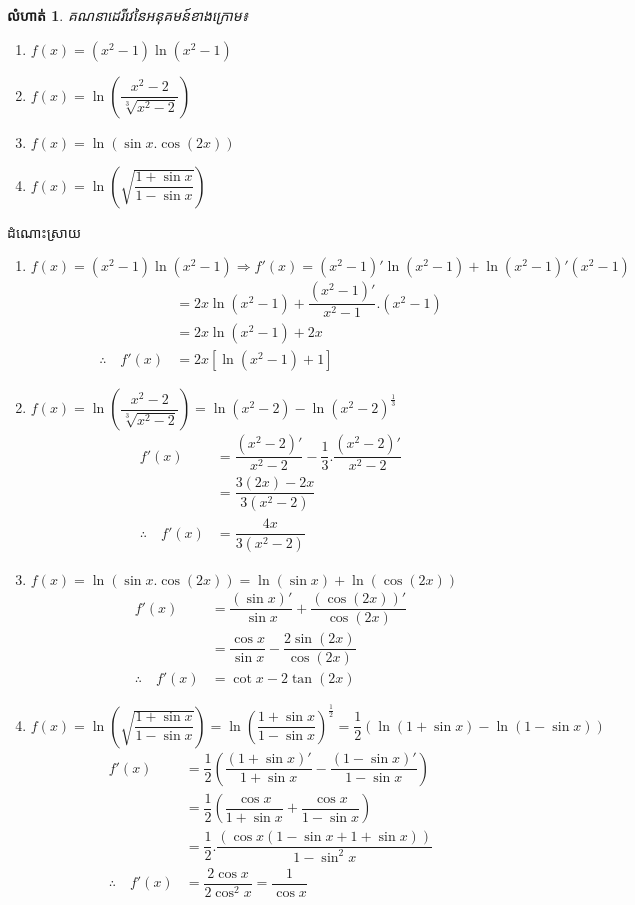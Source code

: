 \documentclass[12pt,fleqn]{book} %
\newtheorem{exercise}{\kml លំហាត់}
\newcommand{\answer}{\begin{center}
\kml \color{magenta} ដំណោះស្រាយ
\end{center}}
\begin{document}
\begin{exercise}
គណនាដេរីវេនៃអនុគមន៍ខាងក្រោម៖
\begin{multicols}{2}
\begin{enumerate}
\item $f(x)=(x^2-1)\ln (x^2-1)$
\item $f(x)=\ln \left( \dfrac{x^2-2}{\sqrt[3]{x^2-2}} \right)$
\item $f(x)=\ln (\sin x.\cos(2x))$
\item $f(x)=\ln \left(\sqrt{\dfrac{1+\sin x}{1-\sin x}} \right)$
\end{enumerate}
\end{multicols}
\end{exercise}
\answer 
\begin{enumerate}
\item $f(x)=(x^2-1)\ln (x^2-1)\Longrightarrow f'(x)=(x^2-1)'\ln (x^2-1)+\ln (x^2-1)' (x^2-1)$
\begin{align*}
&=2x\ln (x^2-1)+\dfrac{(x^2-1)'}{x^2-1}.(x^2-1)\\
&=2x\ln (x^2-1)+2x\\
\therefore \quad f'(x)&=2x[ \ln (x^2-1)+1]
\end{align*}
\item $f(x)=\ln \left( \dfrac{x^2-2}{\sqrt[3]{x^2-2}} \right)=\ln (x^2-2)-\ln (x^2-2)^{\frac{1}{3}}$
\begin{align*}
f'(x)&=\dfrac{(x^2-2)'}{x^2-2}-\dfrac{1}{3}.\dfrac{(x^2-2)'}{x^2-2}\\
&=\dfrac{3(2x)-2x}{3(x^2-2)}\\
\therefore \quad f'(x)&=\dfrac{4x}{3(x^2-2)}
\end{align*}
\item $f(x)=\ln (\sin x.\cos(2x))=\ln (\sin x)+\ln (\cos (2x))$
\begin{align*}
f'(x)&=\dfrac{(\sin x)'}{\sin x}+\dfrac{(\cos (2x))'}{\cos (2x)}\\
&=\dfrac{\cos x}{\sin x}-\dfrac{2\sin (2x)}{\cos (2x)}\\
\therefore \quad f'(x)&= \cot x -2\tan (2x)
\end{align*}
\item $f(x)=\ln \left(\sqrt{\dfrac{1+\sin x}{1-\sin x}} \right)=\ln \left( \dfrac{1+\sin x}{1-\sin x} \right)^{\frac{1}{2}}=\dfrac{1}{2}\left(\ln (1+\sin x)-\ln (1-\sin x)\right)$
\begin{align*}
f'(x)&=\dfrac{1}{2}\left(\dfrac{(1+\sin x)'}{1+\sin x}-\dfrac{(1-\sin x)'}{1-\sin x} \right)\\
&=\dfrac{1}{2}\left(\dfrac{\cos x}{1+\sin x}+\dfrac{\cos x}{1-\sin x} \right)\\
&=\dfrac{1}{2}.\dfrac{\left(\cos x(1-\sin x +1+\sin x) \right)}{1-\sin^2 x}\\
\therefore \quad f'(x)&=\dfrac{2\cos x}{2\cos^2 x}=\dfrac{1}{\cos x}
\end{align*}
\end{enumerate}
\end{document}
